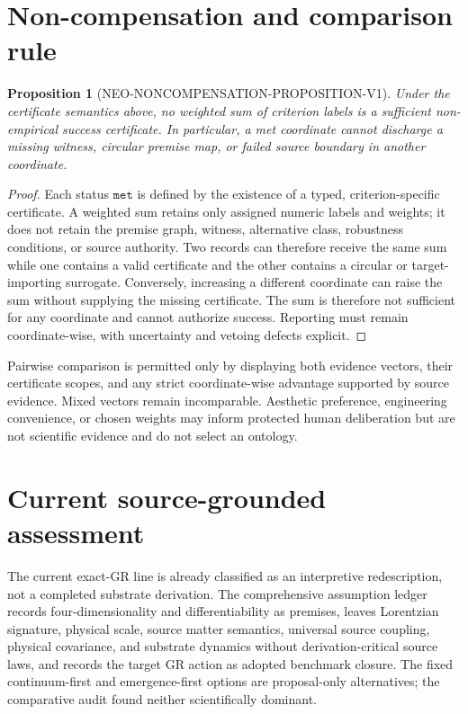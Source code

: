 \documentclass[11pt]{article}
\newtheorem{proposition}{Proposition}
\newcommand{\Met}{\texttt{met}}
\begin{document}
\section{Non-compensation and comparison rule}

\begin{proposition}[NEO-NONCOMPENSATION-PROPOSITION-V1]
Under the certificate semantics above, no weighted sum of criterion labels is
a sufficient non-empirical success certificate.  In particular, a met
coordinate cannot discharge a missing witness, circular premise map, or
failed source boundary in another coordinate.
\end{proposition}

\begin{proof}
Each status \(\Met\) is defined by the existence of a typed,
criterion-specific certificate.  A weighted sum retains only assigned numeric
labels and weights; it does not retain the premise graph, witness, alternative
class, robustness conditions, or source authority.  Two records can therefore
receive the same sum while one contains a valid certificate and the other
contains a circular or target-importing surrogate.  Conversely, increasing a
different coordinate can raise the sum without supplying the missing
certificate.  The sum is therefore not sufficient for any coordinate and
cannot authorize success.  Reporting must remain coordinate-wise, with
uncertainty and vetoing defects explicit.
\end{proof}

Pairwise comparison is permitted only by displaying both evidence vectors,
their certificate scopes, and any strict coordinate-wise advantage supported
by source evidence.  Mixed vectors remain incomparable.  Aesthetic
preference, engineering convenience, or chosen weights may inform protected
human deliberation but are not scientific evidence and do not select an
ontology.

\section{Current source-grounded assessment}

The current exact-GR line is already classified as an interpretive
redescription, not a completed substrate derivation.  The comprehensive
assumption ledger records four-dimensionality and differentiability as
premises, leaves Lorentzian signature, physical scale, source matter
semantics, universal source coupling, physical covariance, and substrate
dynamics without derivation-critical source laws, and records the target GR
action as adopted benchmark closure.  The fixed continuum-first and
emergence-first options are proposal-only alternatives; the comparative audit
found neither scientifically dominant.
\end{document}
